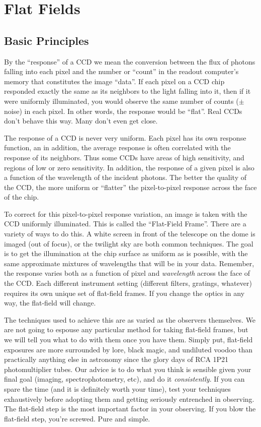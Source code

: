 
\section{Flat Fields}

\subsection{Basic Principles}
\nobreak
By the ``response'' of a CCD we mean the conversion between the flux of
photons falling into each pixel and the number or ``count'' in the readout
computer's memory that constitutes the image ``data''. If each pixel on a CCD
chip responded exactly the same as its neighbors to the light falling into it,
then if it were uniformly illuminated, you would observe the same number of
counts ($\pm$ noise) in each pixel.  In other words, the response would be
``flat''.  Real CCDs don't behave this way.  Many don't even get close. 

The response of a CCD is never very uniform.  Each pixel has its own response
function, an in addition, the average response is often correlated with the
response of its neighbors.  Thus some CCDs have areas of high sensitivity, and
regions of low or zero sensitivity.  In addition, the response of a given
pixel is also a function of the wavelength of the incident photons.  The
better the quality of the CCD, the more uniform or ``flatter'' the
pixel-to-pixel response across the face of the chip. 

To correct for this pixel-to-pixel response variation, an image is taken with
the CCD uniformly illuminated.  This is called the ``Flat-Field Frame''. There
are a variety of ways to do this.  A white screen in front of the telescope on
the dome is imaged (out of focus), or the twilight sky are both common
techniques.  The goal is to get the illumination at the chip surface as
uniform as is possible, with the same approximate mixtures of wavelengths that
will be in your data.  Remember, the response varies both as a function of
pixel and {\it wavelength} across the face of the CCD.  Each different
instrument setting (different filters, gratings, whatever) requires its
own unique set of flat-field frames.  If you change the optics in any way,
the flat-field will change.  

The techniques used to achieve this are as varied as the observers themselves.
We are not going to espouse any particular method for taking flat-field
frames, but we will tell you what to do with them once you have them. Simply
put, flat-field exposures are more surrounded by lore, black magic, and
undiluted voodoo than practically anything else in astronomy since the glory
days of RCA 1P21 photomultiplier tubes.  Our advice is to do what you think is
sensible given your final goal (imaging, spectrophotometry, etc), and do it
{\it consistently}.  If you can spare the time (and it is definitely worth
your time), test your techniques exhaustively before adopting them and getting
seriously entrenched in observing. The flat-field step is the most important
factor in your observing.  If you blow the flat-field step, you're screwed.
Pure and simple. 


